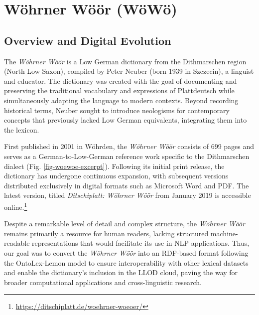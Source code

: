 \section{Wöhrner Wöör (WöWö)}

\subsection{Overview and Digital Evolution}

The \emph{Wöhrner Wöör} is a Low German dictionary from the Dithmarschen region (North Low Saxon), compiled by Peter Neuber (born 1939 in Szczecin), a linguist and educator. The dictionary was created with the goal of documenting and preserving the traditional vocabulary and expressions of Plattdeutsch while simultaneously adapting the language to modern contexts. Beyond recording historical terms, Neuber sought to introduce neologisms for contemporary concepts that previously lacked Low German equivalents, integrating them into the lexicon.

First published in 2001 in Wöhrden, the \emph{Wöhrner Wöör} consists of 699 pages and serves as a German-to-Low-German reference work specific to the Dithmarschen dialect (Fig. \ref{fig-woewoe-excerpt}). Following its initial print release, the dictionary has undergone continuous expansion, with subsequent versions distributed exclusively in digital formats such as Microsoft Word and PDF. %
The latest version, titled \emph{Ditschiplatt: Wöhrner Wöör} from January 2019 is accessible online.\footnote{\url{https://ditschiplatt.de/woehrner-woeoer/}}


Despite a remarkable level of detail and complex structure, %
the \emph{Wöhrner Wöör} remains primarily a resource for human readers, lacking structured machine-readable representations that would facilitate its use in NLP applications. Thus, our goal was to convert the \emph{Wöhrner Wöör} into an RDF-based format following the OntoLex-Lemon model to ensure interoperability with other lexical datasets and enable the dictionary’s inclusion in the LLOD cloud, paving the way for broader computational applications and cross-linguistic research.

